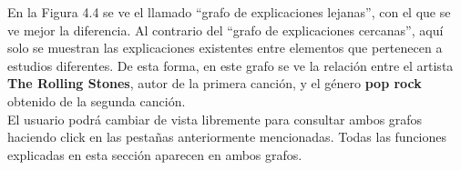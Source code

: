 En la Figura 4.4 se ve el llamado ``grafo de explicaciones lejanas'', con el que se ve mejor la diferencia. Al contrario del ``grafo de explicaciones cercanas'', aquí solo se muestran las explicaciones existentes entre elementos que pertenecen a estudios diferentes. De esta forma, en este grafo se ve la relación entre el artista \textbf{The Rolling Stones}, autor de la primera canción, y el género \textbf{pop rock} obtenido de la segunda canción.\\

El usuario podrá cambiar de vista libremente para consultar ambos grafos haciendo click en las pestañas anteriormente mencionadas. Todas las funciones explicadas en esta sección aparecen en ambos grafos.\\